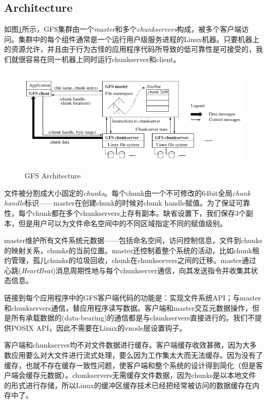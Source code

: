 \documentclass{article}
\begin{document}
\subsection{Architecture}
如图\ref{fig:GFS_Arch}所示，GFS集群由一个\emph{master}和多个\emph{chunkservers}构成，被多个客户端访问。集群中的每个组件通常是一个运行用户级服务进程的Linux机器。只要机器上的资源允许，并且由于行为古怪的应用程序代码所导致的低可靠性是可接受的，我们就很容易在同一机器上同时运行chunkserver和client。\par
\begin{figure}[htbp]
    \centering\includegraphics[height=5cm]{images/GFS_Arch.png}
    \caption{GFS Architecture}
    \label{fig:GFS_Arch}
\end{figure}
文件被分割成大小固定的\emph{chunks}。每个chunk由一个不可修改的64bit全局\emph{chunk handle}标识——master在创建chunk的时候对chunk handle赋值。为了保证可靠性，每个chunk都在多个chunkservers上存有副本。缺省设置下，我们保存3个副本，但是用户可以为文件命名空间中的不同区域指定不同的赋值级别。\par
master维护所有文件系统元数据——包括命名空间，访问控制信息，文件到chunks的映射关系，chunks的当前位置。master还控制着整个系统的活动，比如chunk租约管理，孤儿chunks的垃圾回收，chunk在chunkservers之间的迁移。master通过心跳(\emph{HeartBeat})消息周期性地与每个chunkserver通信，向其发送指令并收集其状态信息。\par
链接到每个应用程序中的GFS客户端代码的功能是：实现文件系统API；与master和chunkservers通信，替应用程序读写数据。客户端和master交互元数据操作，但是所有承载数据的(data-bearing)的通信都是与chunkservers直接进行的。我们不提供POSIX API，因此不需要在Linux的vnode层设置钩子。\par
客户端和chunkserver均不对文件数据进行缓存。客户端缓存收效甚微，因为大多数应用要么对大文件进行流式处理，要么因为工作集太大而无法缓存。因为没有了缓存，也就不存在缓存一致性问题，使客户端和整个系统的设计得到简化（但是客户端会缓存元数据）。chunkservers无需缓存文件数据，因为chunks是以本地文件的形式进行存储，所以Linux的缓冲区缓存技术已经把经常被访问的数据缓存在内存中了。
\end{document}
